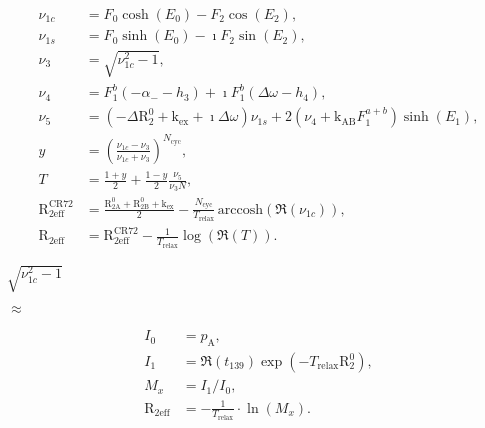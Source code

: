 \documentclass[a4paper,11pt,twoside,openright]{book}
\providecommand{\arccosh}{{\mathrm{arccosh}}}%
\def\lthtmlcheckvsize{\ifdim\ht\sizebox<\vsize 
  \ifdim\wd\sizebox<\hsize\expandafter\hfill\fi \expandafter\vfill
  \else\expandafter\vss\fi}%
\begin{document}
{\newpage\clearpage
\setcounter{equation}{40}
%
\begin{subequations}\begin{align}
\nu_{1c} & = F_0  \cosh(E_0) - F_2 \cos(E_2) , \\
\nu_{1s} & = F_0  \sinh(E_0) - \imath F_2 \sin(E_2), \\
\nu_3 & = \sqrt{\nu_{1c}^2 - 1} , \\
\nu_4 & = F_1^b (-\alpha_- - h_3) + \imath F_1^b (\Delta\omega - h_4) , \\
\nu_5 & = \left(-\Delta \mathrm{R}_2^0+ \textrm{k}_{\textrm{ex}}+ \imath \Delta\omega \right) \nu_{1s} + 2 \left(\nu_4 + \textrm{k}_{\textrm{AB}}F_1^{a+b}\right) \sinh(E_1) , \\
y & = \left( \frac{\nu_{1c} - \nu_3}{\nu_{1c} + \nu_3} \right) ^{N_{\textrm{cyc}}} , \\
T & = \frac{1 + y}{2} + \frac{1 - y}{2} \frac{\nu_5}{\nu_3 N} , \\
\mathrm{R}_{\textrm{2eff}}^{\textrm{CR72}}& = \frac{\mathrm{R}_{\mathrm{2A}}^0+ \mathrm{R}_{\mathrm{2B}}^0+ \textrm{k}_{\textrm{ex}}}{2} - \frac{N_{\textrm{cyc}}}{T_{\textrm{relax}}} \, \arccosh \left(\Re(\nu_{1c})\right) , \\
\mathrm{R}_{\textrm{2eff}}& = \mathrm{R}_{\textrm{2eff}}^{\textrm{CR72}}- \frac{1}{T_{\textrm{relax}}} \log\left(\Re(T)\right) .
\end{align}\end{subequations}%
\lthtmldisplayZ
\lthtmlcheckvsize\clearpage}

{\newpage\clearpage
{}%
$\displaystyle \sqrt{{\nu_{1c}^2-1}}$%
\lthtmlindisplaymathZ
\lthtmlcheckvsize\clearpage}

{\newpage\clearpage
{}%
$\displaystyle \approx$%
\lthtmlindisplaymathZ
\lthtmlcheckvsize\clearpage}

{\newpage\clearpage
\setcounter{equation}{42}
%
\begin{subequations}\begin{align}
I_0 &= p_{\textrm{A}}, \\
I_1 &= \Re(t_{139}) \exp(-T_{\textrm{relax}}\mathrm{R}_2^0), \\
M_x &= I_1 / I_0, \\
\mathrm{R}_{\textrm{2eff}}&= -\frac{1}{T_{\textrm{relax}}} \cdot \ln \left( M_x \right).\end{align}\end{subequations}%
\lthtmldisplayZ
\lthtmlcheckvsize\clearpage}
\end{document}
